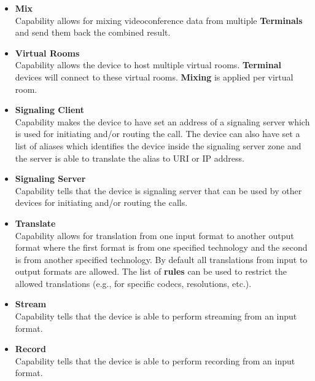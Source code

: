 \begin{itemize}
\item \textbf{Mix}  \\
  Capability allows for mixing videoconference data from multiple 
  \textbf{Terminals} and send them back the combined result.
  
\item \textbf{Virtual Rooms}  \\
  Capability allows the device to host multiple virtual 
  rooms. \textbf{Terminal} devices will connect to these virtual rooms. 
  \textbf{Mixing} is applied per virtual room.

\item \textbf{Signaling Client} \\
  Capability makes the device to have set an address of a signaling server 
  which is used for initiating and/or routing the call. The device can
  also have set a list of aliases which identifies the device inside
  the signaling server zone and the server is able to translate the alias
  to URI or IP address.

\item \textbf{Signaling Server} \\
  Capability tells that the device is signaling server that can be used
  by other devices for initiating and/or routing the calls.

\item \textbf{Translate}  \\
  Capability allows for translation from one input format to another output 
  format where the first format is from one specified technology and the 
  second is from another specified technology. By default all translations 
  from input to output formats are allowed. The list of \textbf{rules} can be 
  used to restrict the allowed translations (e.g., for specific codecs, 
  resolutions, etc.).

\item \textbf{Stream}  \\
  Capability tells that the device is able to perform streaming from an input 
  format.

\item \textbf{Record}  \\
  Capability tells that the device is able to perform recording from an input 
  format.
\end{itemize}

